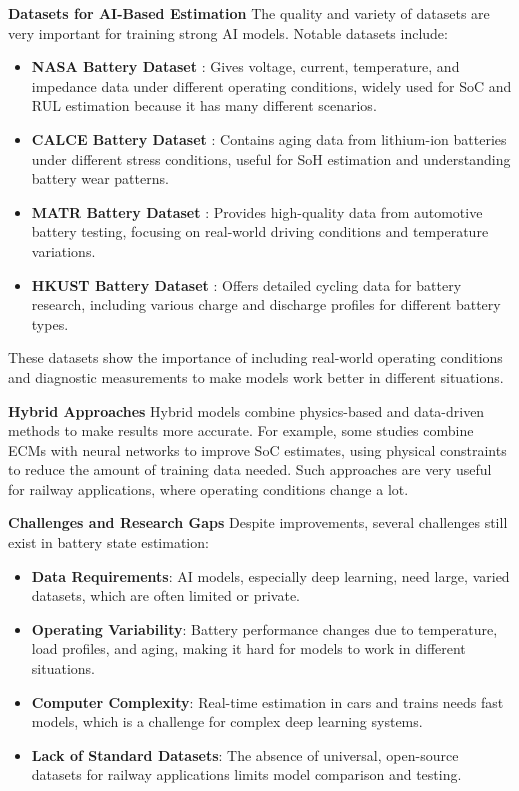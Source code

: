 \textbf{Datasets for AI-Based Estimation}
\label{subsec:datasets}
The quality and variety of datasets are very important for training strong AI models. Notable datasets include:
\begin{itemize}
    \item \textbf{NASA Battery Dataset} \cite{noauthor_nasa_nodate}: Gives voltage, current, temperature, and impedance data under different operating conditions, widely used for SoC and RUL estimation because it has many different scenarios.
    \item \textbf{CALCE Battery Dataset} \cite{CALCE_battery_nodate}: Contains aging data from lithium-ion batteries under different stress conditions, useful for SoH estimation and understanding battery wear patterns.
    \item \textbf{MATR Battery Dataset} \cite{MATR_dataset_nodate}: Provides high-quality data from automotive battery testing, focusing on real-world driving conditions and temperature variations.
    \item \textbf{HKUST Battery Dataset} \cite{pepe_hkust_nodate}: Offers detailed cycling data for battery research, including various charge and discharge profiles for different battery types. 
\end{itemize}
These datasets show the importance of including real-world operating conditions and diagnostic measurements to make models work better in different situations.


\textbf{Hybrid Approaches}
Hybrid models combine physics-based and data-driven methods to make results more accurate. For example, some studies combine ECMs with neural networks to improve SoC estimates, using physical constraints to reduce the amount of training data needed. Such approaches are very useful for railway applications, where operating conditions change a lot.


\textbf{Challenges and Research Gaps}
Despite improvements, several challenges still exist in battery state estimation:
\begin{itemize}
    \item \textbf{Data Requirements}: AI models, especially deep learning, need large, varied datasets, which are often limited or private.
    \item \textbf{Operating Variability}: Battery performance changes due to temperature, load profiles, and aging, making it hard for models to work in different situations.
    \item \textbf{Computer Complexity}: Real-time estimation in cars and trains needs fast models, which is a challenge for complex deep learning systems.
    \item \textbf{Lack of Standard Datasets}: The absence of universal, open-source datasets for railway applications limits model comparison and testing.
\end{itemize}

